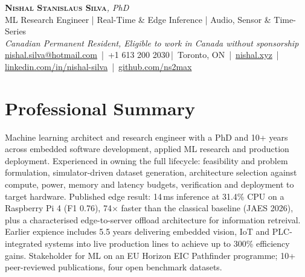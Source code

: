 \documentclass[11pt]{article}
\makeatletter
\newcommand{\cvName}{Nishal Stanislaus Silva}
\newcommand{\cvEmail}{nishal.silva@hotmail.com}
\newcommand{\cvPhone}{+1 613 200 2030}
\newcommand{\cvCity}{Toronto, ON}
\newcommand{\cvSite}{https://nishal.xyz}
\newcommand{\cvLinkedIn}{https://www.linkedin.com/in/nishal-silva}
\newcommand{\cvGitHub}{https://github.com/ns2max}
\newcommand{\cvStatus}{Canadian Permanent Resident, Eligible to work in Canada without sponsorship}
\newcommand{\cvTagline}{ML Research Engineer | Real-Time \& Edge Inference | Audio, Sensor \& Time-Series}
\makeatother
\begin{document}
\pagestyle{empty}
\begin{center}
    {\LARGE \scshape \textbf{\cvName}}{\large \textit{, PhD}}\\[1pt]
    {\small \cvTagline}\\[1pt]
    {\footnotesize\textit{\cvStatus}}\\[1pt]
    {\small
    \href{mailto:\cvEmail}{\cvEmail} \,|\, \cvPhone \,|\, \cvCity
    \,|\, \href{\cvSite}{nishal.xyz} \,|\, \href{\cvLinkedIn}{linkedin.com/in/nishal-silva}
    \,|\, \href{\cvGitHub}{github.com/ns2max}}
\end{center}



\section*{Professional Summary}
 
Machine learning architect and research engineer with a PhD and 10+ years across embedded software development, applied ML research and production deployment. Experienced in owning the full lifecycle: feasibility and problem formulation, simulator-driven dataset generation, architecture selection against compute, power, memory and latency budgets, verification and deployment to target hardware. Published edge result: 14\,ms inference at 31.4\% CPU on a Raspberry Pi 4 (F1 0.76), 74$\times$ faster than the classical baseline (JAES 2026), plus a characterised edge-to-server offload architecture for information retreival. Earlier expience includes 5.5 years delivering embedded vision, IoT and PLC-integrated systems into live production lines  to achieve up to 300\% efficiency gains. Stakeholder for ML on an EU Horizon EIC Pathfinder programme; 10+ peer-reviewed publications, four open benchmark datasets.
 
\end{document}
